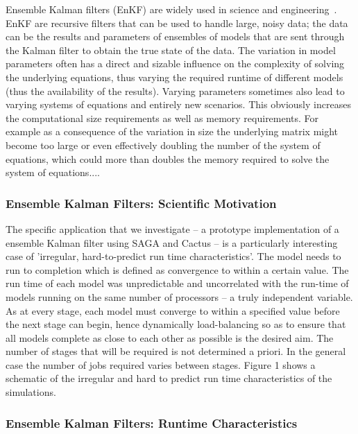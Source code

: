\documentclass[conference,final]{IEEEtran}
\begin{document}
Ensemble Kalman filters (EnKF) are widely used in science and
engineering~\cite{DataAssim, KalmanPaper}. EnKF are recursive filters
that can be used to handle large, noisy data; the data can be the
results and parameters of ensembles of models that are sent through
the Kalman filter to obtain the true state of the data. The variation
in model parameters often has a direct and sizable influence on the
complexity of solving the underlying equations, thus varying the
required runtime of different models (thus the availability of the
results).  Varying parameters sometimes also lead to varying systems
of equations and entirely new scenarios. This obviously increases the
computational size requirements as well as memory requirements.  For
example as a consequence of the variation in size the underlying
matrix might become too large or even effectively doubling the number
of the system of equations, which could more than doubles the memory
required to solve the system of equations....

\subsubsection{Ensemble Kalman Filters: Scientific Motivation}
The specific application that we investigate -- a prototype
implementation of a ensemble Kalman filter using SAGA and Cactus -- is
a particularly interesting case of 'irregular, hard-to-predict run
time characteristics'.  The model needs to run to completion which is
defined as convergence to within a certain value.  The run time of
each model was unpredictable and uncorrelated with the run-time of
models running on the same number of processors -- a truly independent
variable.  As at every stage, each model must converge to within a
specified value before the next stage can begin, hence dynamically
load-balancing so as to ensure that all models complete as close to
each other as possible is the desired aim.  The number of stages that
will be required is not determined a priori. In the general case the
number of jobs required varies between stages.  Figure 1 shows a
schematic of the irregular and hard to predict run time
characteristics of the simulations.

\subsubsection{Ensemble Kalman Filters: Runtime Characteristics}
\end{document}
